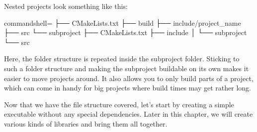 Nested projects look something like this:

\begin{tcblisting}{commandshell={}}
├── CMakeLists.txt
├── build
├── include/project_name
├── src
└── subproject
        ├── CMakeLists.txt
        ├── include
        │       └── subproject
        └── src
\end{tcblisting}

Here, the folder structure is repeated inside the subproject folder. Sticking to such a folder structure and making the subproject buildable on its own makes it easier to move projects around. It also allows you to only build parts of a project, which can come in handy for big projects where build times may get rather long.

Now that we have the file structure covered, let's start by creating a simple executable without any special dependencies. Later in this chapter, we will create various kinds of libraries and bring them all together.


















